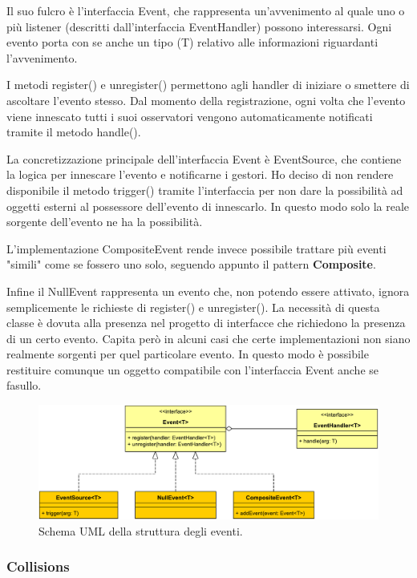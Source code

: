\documentclass[a4paper,12pt]{report}
\begin{document}
Il suo fulcro è l'interfaccia Event, che rappresenta un'avvenimento al quale uno o più listener (descritti dall'interfaccia EventHandler) possono interessarsi.
Ogni evento porta con se anche un tipo (T) relativo alle informazioni riguardanti l'avvenimento.

I metodi register() e unregister() permettono agli handler di iniziare o smettere di ascoltare l'evento stesso.
Dal momento della registrazione, ogni volta che l'evento viene innescato tutti i suoi osservatori vengono automaticamente notificati tramite il metodo handle().

La concretizzazione principale dell'interfaccia Event è EventSource, che contiene la logica per innescare l'evento e notificarne i gestori.
Ho deciso di non rendere disponibile il metodo trigger() tramite l'interfaccia per non dare la possibilità ad oggetti esterni al possessore dell'evento di innescarlo.
In questo modo solo la reale sorgente dell'evento ne ha la possibilità.

L'implementazione CompositeEvent rende invece possibile trattare più eventi "simili" come se fossero uno solo, seguendo appunto il pattern \textbf{Composite}.

Infine il NullEvent rappresenta un evento che, non potendo essere attivato, ignora semplicemente le richieste di register() e unregister().
La necessità di questa classe è dovuta alla presenza nel progetto di interfacce che richiedono la presenza di un certo evento.
Capita però in alcuni casi che certe implementazioni non siano realmente sorgenti per quel particolare evento.
In questo modo è possibile restituire comunque un oggetto compatibile con l'interfaccia Event anche se fasullo.

\begin{figure}[H]
\includegraphics[width=\linewidth]{img/events}
\caption{Schema UML della struttura degli eventi.}
\label{img:events}
\end{figure}

\subsubsection*{Collisions}
\end{document}
